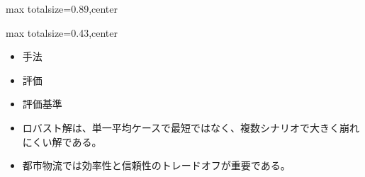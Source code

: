 \begin{minipage}[t]{0.58\textwidth}
\begin{adjustbox}{max totalsize={\textwidth}{0.89\textheight},center}
\begin{minipage}{\textwidth}
\end{minipage}
\end{adjustbox}
\end{minipage}


\clearpage
{}
\begin{minipage}[t]{0.405\textwidth}
\begin{adjustbox}{max totalsize={\textwidth}{0.43\textheight},center}
\begin{minipage}{\textwidth}\scriptsize
{}\begin{itemize}
\item 手法
\item 評価
\item 評価基準
\end{itemize}\begin{itemize}
\item ロバスト解は、単一平均ケースで最短ではなく、複数シナリオで大きく崩れにくい解である。
\item 都市物流では効率性と信頼性のトレードオフが重要である。
\end{itemize}
\end{minipage}
\end{adjustbox}
\end{minipage}\hfill
